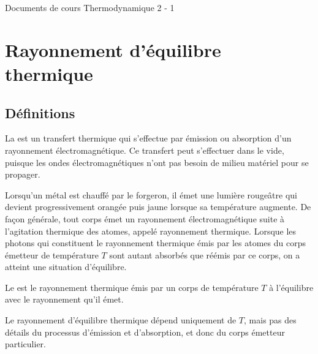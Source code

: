 \documentclass[12pt,fancy]{cours}
\begin{document}
{
\item Documents de cours Thermodynamique 2 - 1
}


\section{Rayonnement  d'équilibre thermique}
\subsection{Définitions}

La  est un transfert thermique qui s'effectue par émission ou absorption d'un rayonnement électromagnétique. Ce transfert peut s'effectuer dans le vide, puisque les ondes électromagnétiques n'ont pas besoin de milieu matériel pour se propager.

Lorsqu'un métal est chauffé par le forgeron, il émet une lumière rougeâtre qui devient progressivement orangée puis jaune lorsque sa température augmente. De façon générale, tout corps émet un rayonnement électromagnétique suite à l'agitation thermique des atomes, appelé rayonnement thermique.  Lorsque les photons qui constituent le rayonnement thermique émis par les atomes du corps émetteur de température $T$ sont autant absorbés que réémis par ce corps, on a atteint une situation d'équilibre.
\begin{definition}
Le  est le rayonnement thermique émis par un corps de température $T$ à l'équilibre avec le rayonnement qu'il émet.
\end{definition}
\noindent
Le rayonnement d'équilibre thermique dépend uniquement de $T$, mais pas des détails du processus d'émission et d'absorption, et donc du corps émetteur particulier.
\end{document}
